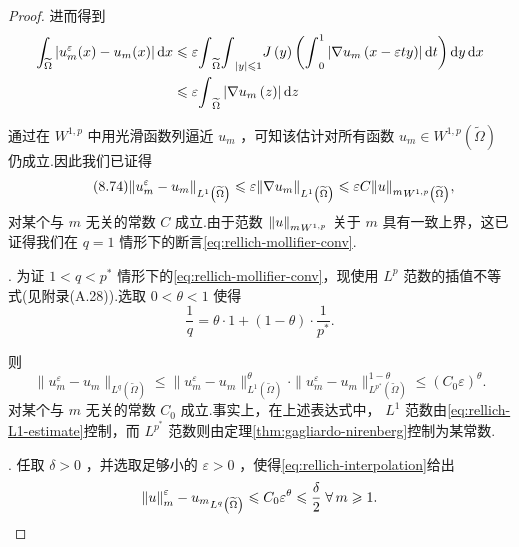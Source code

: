\begin{proof}
进而得到
\begin{align*}
    \int_{\widetilde{\Omega }}\left| {u_m^{\varepsilon }(x)-u_m(x) }\right| {\mathop{}\!\mathrm{d} x} &\leqslant  \varepsilon {\int }_{\widetilde{\Omega }}{\int }_{\left| y\right| \leqslant  1}J\left( y\right) \left( {{\int }_{0}^{1}\left| {\nabla {u}_{m}\left( {x - {\varepsilon ty}}\right) }\right| {\mathop{}\!\mathrm{d} t}}\right) {\mathop{}\!\mathrm{d} y\mathop{}\!\mathrm{d} x}\\
    &\leqslant  \varepsilon {\int }_{\widetilde{\Omega }}\left| {\nabla {u}_{m}\left( z\right) }\right| {\mathop{}\!\mathrm{d} z}
\end{align*}


通过在 ${W}^{1,p}$ 中用光滑函数列逼近 ${u}_{m}$ ，可知该估计对所有函数 ${u}_{m} \in  {W}^{1,p}\left( \widetilde{\Omega }\right)$ 仍成立.因此我们已证得
\begin{equation}\tag{8.74}\label{eq:rellich-L1-estimate}
\norm{{u}_{m}^{\varepsilon }-{u}_{m}}_{{L}^{1}\left( \widetilde{\Omega }\right) }  \leqslant   \varepsilon \norm{\nabla {u}_{m}}_{{L}^{1}\left( \widetilde{\Omega }\right) }  \leqslant   {\varepsilon C}{\norm{u}_{m}}_{{W}^{1,p}\left( \widetilde{\Omega }\right) },
\end{equation}
对某个与 $m$ 无关的常数 $C$ 成立.由于范数 ${\norm{u}_{m}}_{{W}^{1,p}}$ 关于 $m$ 具有一致上界，这已证得我们在 $q = 1$ 情形下的断言\eqref{eq:rellich-mollifier-conv}.

. 为证 $1 < q < {p}^{ * }$ 情形下的\eqref{eq:rellich-mollifier-conv}，现使用 ${L}^{p}$ 范数的插值不等式(见附录(A.28)).选取 $0 < \theta  < 1$ 使得
\[
\frac{1}{q} = \theta  \cdot  1 + \left( {1 - \theta }\right)  \cdot  \frac{1}{{p}^{ * }}.
\]

则
\begin{equation}\tag{8.75}\label{eq:rellich-interpolation}
\| {u}_{m}^{\varepsilon } - {u}_{m} \|_{{L}^{q}\left( \widetilde{\Omega }\right) } \leq  \| {u}_{m}^{\varepsilon } - {u}_{m} \|_{{L}^{1}\left( \widetilde{\Omega }\right) }^{\theta } \cdot  \| {u}_{m}^{\varepsilon } - {u}_{m} \|_{{L}^{{p}^{ * }}\left( \widetilde{\Omega }\right) }^{1 - \theta } \leq  \left( {C}_{0}\varepsilon \right) ^{\theta }.
\end{equation}
对某个与 $m$ 无关的常数 ${C}_{0}$ 成立.事实上，在上述表达式中， ${L}^{1}$ 范数由\eqref{eq:rellich-L1-estimate}控制，而 ${L}^{{p}^{ * }}$ 范数则由定理\ref{thm:gagliardo-nirenberg}控制为某常数.

. 任取 $\delta  > 0$ ，并选取足够小的 $\varepsilon  > 0$ ，使得\eqref{eq:rellich-interpolation}给出
\[
{\norm{u}_{m}^{\varepsilon } - {u}_{m}}_{{L}^{q}\left( \widetilde{\Omega }\right) } \leqslant  {C}_{0}{\varepsilon }^{\theta } \leqslant  \frac{\delta }{2}\;\forall\,m \geqslant  1.
\]


\end{proof}
